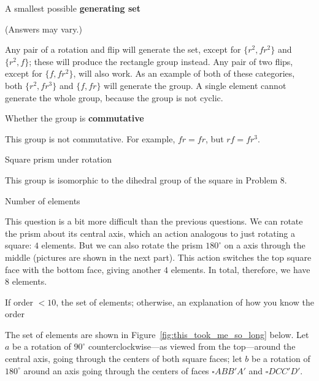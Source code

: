 \documentclass[../key.tex]{subfiles}
\begin{document}
\begin{inner_problem}
\item A smallest possible \textbf{generating set}
\end{inner_problem}

\noindent(Answers may vary.)

Any pair of a rotation and flip will generate the set, except for $\{r^2,fr^2\}$ and $\{r^2,f\}$; these will produce the rectangle group instead. Any pair of two flips, except for $\{f,fr^2\}$, will also work. As an example of both of these categories, both $\{r^2,fr^3\}$ and $\{f,fr\}$ will generate the group. A single element cannot generate the whole group, because the group is not cyclic.

\begin{inner_problem}
\item Whether the group is \textbf{commutative}
\end{inner_problem}

\noindent This group is not commutative. For example, $fr=fr$, but $rf=fr^3$.

\begin{outer_problem}
\item Square prism under rotation
\end{outer_problem}

\noindent This group is isomorphic to the dihedral group of the square in Problem 8.

\begin{inner_problem}[start=1]
\item Number of elements
\end{inner_problem}

\noindent This question is a bit more difficult than the previous questions. We can rotate the prism about its central axis, which an action analogous to just rotating a square: $4$ elements. But we can also rotate the prism $180^\circ$ on a axis through the middle (pictures are shown in the next part). This action switches the top square face with the bottom face, giving another $4$ elements. In total, therefore, we have $8$ elements.

\begin{inner_problem}
\item If order $< 10$, the set of elements; otherwise, an explanation of how you know the order
\end{inner_problem}

\noindent The set of elements are shown in Figure~\ref{fig:this_took_me_so_long} below. Let $a$ be a rotation of $90^\circ$ counterclockwise---as viewed from the top---around the central axis, going through the centers of both square faces; let $b$ be a rotation of $180^\circ$ around an axis going through the centers of faces $\square ABB'A'$ and $\square DCC'D'$.
\end{document}

